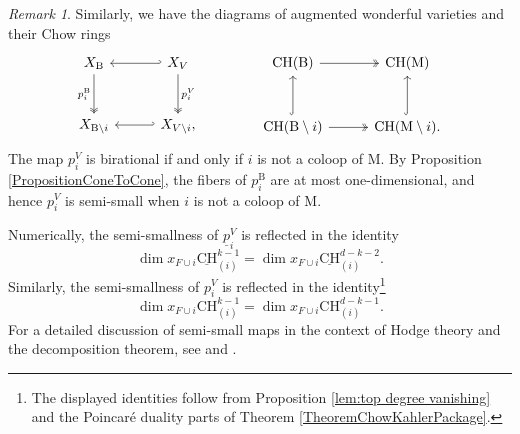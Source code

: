 \documentclass[11pt,reqno]{amsart}
\theoremstyle{definition}
\theoremstyle{remark}
\newtheorem{remark}[theorem]{Remark}
\renewcommand{\dim}{\operatorname{dim}}
\renewcommand{\(}{\left(}
\renewcommand{\)}{\right)}
\newcommand{\<}{\left<}
\renewcommand{\>}{\right>}
\newcommand{\CH}{\operatorname{CH}}
\begin{document}
\begin{remark}
Similarly, we have the  diagrams of augmented wonderful varieties and their Chow rings
\[
\begin{tikzcd}[column sep=10mm, row sep=10mm]
X_\mathrm{B}  \arrow[d, two heads, "p_i^\mathrm{B}"'] & X_V \arrow[d, two heads, "p_i^V"]  \arrow[l, hook']\\
X_{\mathrm{B} \setminus i} & X_{V \setminus i}, \arrow[l, hook']
\end{tikzcd}
\qquad  \qquad
\begin{tikzcd}[column sep=10mm, row sep=10mm]
\CH(\mathrm{B}) \arrow[r, two heads]& \CH(\mathrm{M})  \\
\CH({\mathrm{B} \setminus i}) \arrow[u, hook]\arrow[r, two heads]& \CH(\mathrm{M} \setminus i). \arrow[u, hook]
\end{tikzcd}
\]
The map  $p_i^V$ is birational if and only if $i$ is not a coloop of $\mathrm{M}$.
By Proposition \ref{PropositionConeToCone}, the fibers of  $p_i^\mathrm{B}$ are at most one-dimensional,
and hence %
$p_i^V$ is semi-small when $i$ is not a coloop of $\mathrm{M}$.


Numerically,
the semi-smallness of $\underline{p}_i^V$  %
 is reflected in the identity%
\[
\dim  x_{F\cup i}\underline{\mathrm{CH}}^{k-1}_{(i)}  = \dim  x_{F\cup i}\underline{\mathrm{CH}}_{(i)}^{d-k-2}.
\]
Similarly,
the semi-smallness of $p_i^V$ %
is reflected in the identity\footnote{The displayed identities follow from Proposition \ref{lem:top degree vanishing} and the Poincar\'e duality parts of Theorem \ref{TheoremChowKahlerPackage}.}
\[
\dim  x_{F\cup i}\mathrm{CH}^{k-1}_{(i)}  = \dim  x_{F\cup i}\mathrm{CH}_{(i)}^{d-k-1}.
\]
For a detailed discussion of semi-small maps in the context of Hodge theory and the decomposition theorem, see \cite{dCM2} and \cite{dCM1}.
\end{remark}
\end{document}
